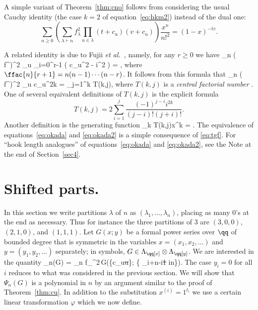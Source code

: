 \documentclass[12pt]{article}
\theoremstyle{definition}
\theoremstyle{remark}
\begin{document}
\medskip
A simple variant of Theorem~\ref{thm:cno} follows from considering the
usual Cauchy identity (the case $k=2$ of equation~\eqref{eq:hkm2})
instead of the dual one:
  $$  \sum_{n\geq 0}\left( \sum_{\lambda\vdash n} f_\lambda^2
  \prod_{u\in\lambda} (t+c_u)(v+c_u)\right)\frac{x^n}{n!^2} =
   (1-x)^{-tv}. $$ 

A related identity is due to Fujii \emph{et al.}\
\cite[Appendix]{fkmo}, namely, for any $r\geq 0$ we have
 \beq {} \sum_{\lambda \vdash n}
  ( f^\lambda )^2 \sum_{u \in \lambda}
    \prod_{i=0}^{r-1} ( c_u^2 - i^2 ) =
     , \label{eq:okada} \eeq
where $\ffac{n}{r+1}=n(n-1)\cdots (n-r)$. It follows from this formula 
that
  \beq {} \sum_{\lambda \vdash n}
  ( f^\lambda )^2 \sum_{u \in \lambda}c_u^{2k} =
   \sum_{j=1}^k T(k,j), 
    \label{eq:okada2} \eeq
where $T(k,j)$ is a \emph{central factorial number}
\cite[Exer.~5.8]{ec2}. One of several equivalent definitions of
$T(k,j)$ is the explicit formula
  $$ T(k,j) =2\sum_{i=1}^j \frac{(-1)^{j-i}i^{2k}}{(j-i)!(j+i)!}. $$ 
Another definition is the generating function 
  \beq \sum_{k} T(k,j)x^k = . \label{eq:tgf} \eeq
The equivalence of equations~\eqref{eq:okada} and \eqref{eq:okada2} is
a simple consequence of \eqref{eq:tgf}.
For ``hook length analogues'' of
equations~\eqref{eq:okada} and \eqref{eq:okada2}, see the Note at the
end of Section~\ref{sec4}. 

\section{Shifted parts.} \label{sec3}
In this section we write partitions $\lambda$ of $n$ as
$(\lambda_1,\dots,\lambda_n)$, placing as many 0's at the end as
necessary. Thus for instance the three partitions of 3 are $(3,0,0)$,
$(2,1,0)$, and $(1,1,1)$. Let $G(x;y)$ be a formal power
series over $\qq$ of bounded degree that is
symmetric in the variables $x=(x_1,x_2,\dots)$ and $y=(y_1,y_2,\dots)$
separately; in symbols, $G\in \Lambda_\qq[x]\otimes
\Lambda_\qq[y]$. We are interested in the quantity 
  \beq \Psi_n(G) = \sum_{\lambda\vdash n}
    f_\lambda^2\,G(\{c_u\st u\in\lambda\}; \{ \lambda_i+n-i\st 1\leq
    i\leq n\}). \label{eq:psing} \eeq
       The case $y_i=0$ for all $i$ reduces to what was considered in the
previous section.  We will show that $\Psi_n(G)$ is a polynomial
in $n$ by an argument similar to the proof of Theorem~\ref{thm:cu}. In
addition to the substitution $x^{(i)}=1^{t_i}$ we use a certain linear
transformation $\varphi$ which we now define.
\end{document}
